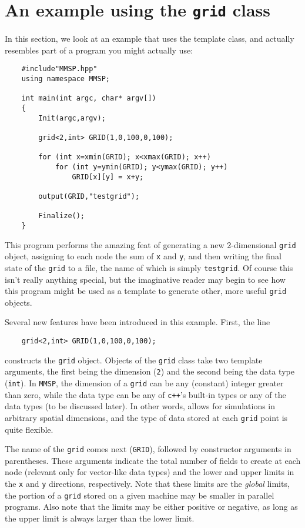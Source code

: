 \section{An example using the {\tt grid} class}
In this section, we look at an example that uses the  template class, and actually resembles part of a program you might actually use:
\begin{shadebox}
\begin{verbatim}
    #include"MMSP.hpp"
    using namespace MMSP;

    int main(int argc, char* argv[])
    {
        Init(argc,argv);

        grid<2,int> GRID(1,0,100,0,100);

        for (int x=xmin(GRID); x<xmax(GRID); x++)
            for (int y=ymin(GRID); y<ymax(GRID); y++)
                GRID[x][y] = x+y;

        output(GRID,"testgrid");

        Finalize();
    }
\end{verbatim}
\end{shadebox}
This program performs the amazing feat of generating a new 2-dimensional {\tt grid} object, assigning to each node the sum of {\tt x} and {\tt y}, and then writing the final state of the {\tt grid} to a file, the name of which is simply {\tt testgrid}.  Of course this isn't really anything special, but the imaginative reader may begin to see how this program might be used as a template to generate other, more useful {\tt grid} objects.

Several new features have been introduced in this example.  First, the line
\begin{shadebox}
\begin{verbatim}
    grid<2,int> GRID(1,0,100,0,100);
\end{verbatim}
\end{shadebox}
constructs the {\tt grid} object.  Objects of the {\tt grid} class take two template arguments, the first being the dimension ({\tt 2}) and the second being the data type ({\tt int}).  In {\tt MMSP}, the dimension of a {\tt grid} can be any (constant) integer greater than zero, while the data type can be any of {\tt c++}'s built-in types or any of the \MMSP data types (to be discussed later).  In other words, \MMSP allows for simulations in arbitrary spatial dimensions, and the type of data stored at each {\tt grid} point is quite flexible.

The name of the {\tt grid} comes next ({\tt GRID}), followed by constructor arguments in parentheses.  These arguments indicate the total number of fields to create at each node (relevant only for vector-like data types) and the lower and upper limits in the {\tt x} and {\tt y} directions, respectively.  Note that these limits are the {\em global} limits, the portion of a {\tt grid} stored on a given machine may be smaller in parallel programs.  Also note that the limits may be either positive or negative, as long as the upper limit is always larger than the lower limit.


